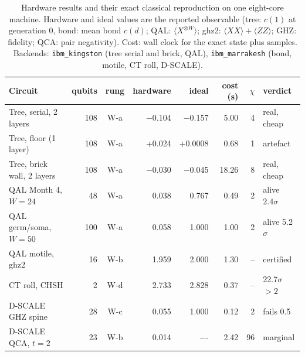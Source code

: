 \begin{table}[t]
\centering
\caption{Hardware results and their exact classical reproduction on one eight-core machine. Hardware and ideal values are the reported observable (tree: $c(1)$ at generation 0, bond: mean bond $c(d)$; QAL: $\langle X^{\otimes W}\rangle$; ghz2: $\langle XX\rangle+\langle ZZ\rangle$; GHZ: fidelity; QCA: pair negativity). Cost: wall clock for the exact state plus samples. Backends: \texttt{ibm\_kingston} (tree serial and brick, QAL), \texttt{ibm\_marrakesh} (bond, motile, CT roll, D-SCALE).}
\label{tab:record}
\begin{tabular}{lrcrrrrl}
\toprule
Circuit & qubits & rung & hardware & ideal & cost (s) & $\chi$ & verdict\\
\midrule
Tree, serial, 2 layers & 108 & W-a & $-$0.104 & $-$0.157 & 5.00 & 4 & real, cheap\\
Tree, floor (1 layer) & 108 & W-a & +0.024 & +0.0008 & 0.68 & 1 & artefact\\
Tree, brick wall, 2 layers & 108 & W-a & $-$0.030 & $-$0.045 & 18.26 & 8 & real, cheap\\
QAL Month 4, $W=24$ & 48 & W-a & 0.038 & 0.767 & 0.49 & 2 & alive $2.4\sigma$\\
QAL germ/soma, $W=50$ & 100 & W-a & 0.058 & 1.000 & 1.00 & 2 & alive 5.2$\sigma$\\
QAL motile, ghz2 & 16 & W-b & 1.959 & 2.000 & 1.30 & -- & certified\\
CT roll, CHSH & 2 & W-d & 2.733 & 2.828 & 0.37 & -- & 22.7$\sigma$ $>2$\\
D-SCALE GHZ spine & 28 & W-c & 0.055 & 1.000 & 0.12 & 2 & fails 0.5\\
D-SCALE QCA, $t=2$ & 23 & W-b & 0.014 & $-$- & 2.42 & 96 & marginal\\
\bottomrule
\end{tabular}
\end{table}
